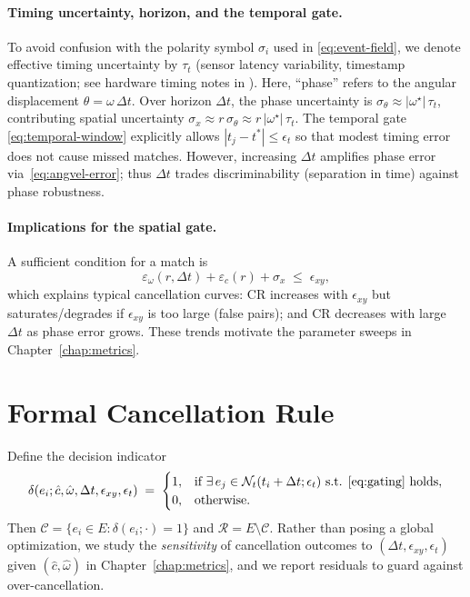 \paragraph{Timing uncertainty, horizon, and the temporal gate.}
To avoid confusion with the polarity symbol $\sigma_i$ used in \eqref{eq:event-field}, we denote effective timing uncertainty by $\tau_t$ (sensor latency variability, timestamp quantization; see hardware timing notes in \cite{Lichtsteiner2008DVS,Delbruck2014ISCAS}). Here, ``phase'' refers to the angular displacement $\theta=\omega\,\Delta t$. Over horizon $\Delta t$, the phase uncertainty is $\sigma_\theta \approx |\omega^\star|\,\tau_t$, contributing spatial uncertainty $\sigma_x \approx r\,\sigma_\theta \approx r\,|\omega^\star|\,\tau_t$. The temporal gate \eqref{eq:temporal-window} explicitly allows $|t_j-t^*|\le \epsilon_t$ so that modest timing error does not cause missed matches. However, increasing $\Delta t$ amplifies phase error via~\eqref{eq:angvel-error}; thus $\Delta t$ trades discriminability (separation in time) against phase robustness.

\paragraph{Implications for the spatial gate.}
A sufficient condition for a match is
\begin{equation}
\varepsilon_{\omega}(r,\Delta t) + \varepsilon_c(r) + \sigma_x \;\le\; \epsilon_{xy},
\label{eq:gate-condition}
\end{equation}
which explains typical cancellation curves: $\mathrm{CR}$ increases with $\epsilon_{xy}$ but saturates/degrades if $\epsilon_{xy}$ is too large (false pairs); and $\mathrm{CR}$ decreases with large $\Delta t$ as phase error grows. These trends motivate the parameter sweeps in Chapter~\ref{chap:metrics}.

\section{Formal Cancellation Rule}
Define the decision indicator
\begin{equation}
\delta(e_i; \hat c,\hat\omega,\Delta t,\epsilon_{xy},\epsilon_t) \;=\;
\begin{cases}
1, & \text{if } \exists\, e_j \in \mathcal{N}_t(t_i+\Delta t;\epsilon_t) \text{ s.t. } \eqref{eq:gating}\text{ holds},\\
0, & \text{otherwise.}
\end{cases}
\label{eq:delta-indicator}
\end{equation}
Then $\mathcal{C}=\{e_i\in E:\delta(e_i;\cdot)=1\}$ and $\mathcal{R}=E\setminus \mathcal{C}$. Rather than posing a global optimization, we study the \emph{sensitivity} of cancellation outcomes to $(\Delta t,\epsilon_{xy},\epsilon_t)$ given $(\hat c,\hat\omega)$ in Chapter~\ref{chap:metrics}, and we report residuals to guard against over-cancellation.


